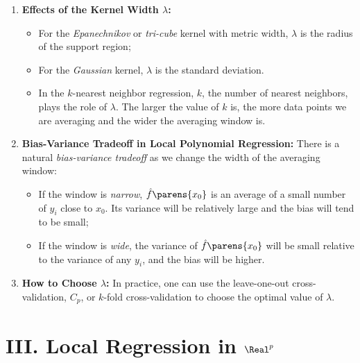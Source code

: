\documentclass[12pt]{article}
\begin{document}
\begin{enumerate}[label=\textbf{\arabic*.}]

	\item \textbf{Effects of the Kernel Width $\lambda$:} 
	\begin{itemize}
		\item For the \textit{Epanechnikov} or \textit{tri-cube} kernel with metric width, $\lambda$ is the radius of the support region; 
		\item For the \textit{Gaussian} kernel, $\lambda$ is the standard deviation. 
		\item In the $k$-nearest neighbor regression, $k$, the number of nearest neighbors, plays the role of $\lambda$. The larger the value of $k$ is, the more data points we are averaging and the wider the averaging window is. 
	\end{itemize}
	
	\item \textbf{Bias-Variance Tradeoff in Local Polynomial Regression:} There is a natural \textit{bias-variance tradeoff} as we change the width of the averaging window: 
	\begin{itemize}
		\item If the window is \textit{narrow}, $\hat{f} \parens{x_0}$ is an average of a small number of $y_i$ close to $x_0$. Its variance will be relatively large and the bias will tend to be small; 
		\item If the window is \textit{wide}, the variance of $\hat{f} \parens{x_0}$ will be small relative to the variance of any $y_i$, and the bias will be higher. 
	\end{itemize}
	
	\item \textbf{How to Choose $\lambda$:} In practice, one can use the leave-one-out cross-validation, $C_p$, or $k$-fold cross-validation to choose the optimal value of $\lambda$. 
\end{enumerate}


\section*{III. Local Regression in $\Real^p$}
\end{document}
